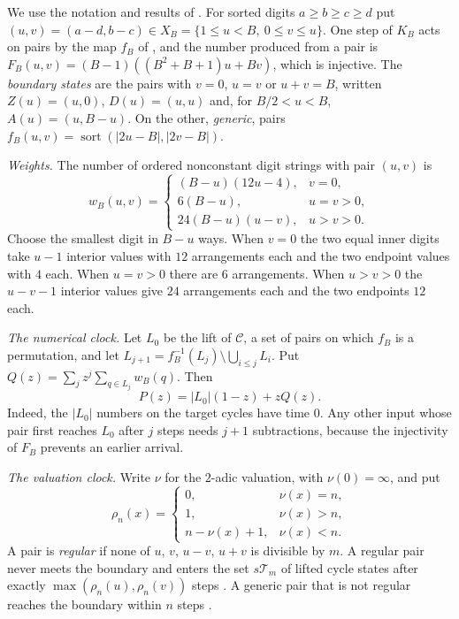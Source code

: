 \documentclass[11pt]{amsart}
\theoremstyle{remark}
\DeclareMathOperator{\sort}{sort}
\newcommand{\T}{\mathcal{T}}
\newcommand{\C}{\mathcal{C}}
\newcommand{\vt}{\nu}
\begin{document}
We use the notation and results of \cite{G1}. For sorted digits $a\ge b\ge c\ge d$ put $(u,v)=(a-d,b-c)\in X_B=\{1\le u<B,\ 0\le v\le u\}$. One step of $K_B$ acts on pairs by the map $f_B$ of \cite[(1)]{G1}, and the number produced from a pair is $F_B(u,v)=(B-1)((B^2+B+1)u+Bv)$, which is injective. The \emph{boundary states} are the pairs with $v=0$, $u=v$ or $u+v=B$, written $Z(u)=(u,0)$, $D(u)=(u,u)$ and, for $B/2<u<B$, $A(u)=(u,B-u)$. On the other, \emph{generic}, pairs $f_B(u,v)=\sort(|2u-B|,|2v-B|)$.

\emph{Weights.} The number of ordered nonconstant digit strings with pair $(u,v)$ is
\begin{equation}\label{eq:weight}
w_B(u,v)=\begin{cases}(B-u)(12u-4),&v=0,\\6(B-u),&u=v>0,\\24(B-u)(u-v),&u>v>0.\end{cases}
\end{equation}
Choose the smallest digit in $B-u$ ways. When $v=0$ the two equal inner digits take $u-1$ interior values with $12$ arrangements each and the two endpoint values with $4$ each. When $u=v>0$ there are $6$ arrangements. When $u>v>0$ the $u-v-1$ interior values give $24$ arrangements each and the two endpoints $12$ each.

\emph{The numerical clock.} Let $L_0$ be the lift of $\C$, a set of pairs on which $f_B$ is a permutation, and let $L_{j+1}=f_B^{-1}(L_j)\setminus\bigcup_{i\le j}L_i$. Put $Q(z)=\sum_jz^j\sum_{q\in L_j}w_B(q)$. Then
\begin{equation}\label{eq:clock}
P(z)=|L_0|(1-z)+zQ(z).
\end{equation}
Indeed, the $|L_0|$ numbers on the target cycles have time $0$. Any other input whose pair first reaches $L_0$ after $j$ steps needs $j+1$ subtractions, because the injectivity of $F_B$ prevents an earlier arrival.

\emph{The valuation clock.} Write $\vt$ for the $2$-adic valuation, with $\vt(0)=\infty$, and put
\[
\rho_n(x)=\begin{cases}0,&\vt(x)=n,\\1,&\vt(x)>n,\\n-\vt(x)+1,&\vt(x)<n.\end{cases}
\]
A pair is \emph{regular} if none of $u$, $v$, $u-v$, $u+v$ is divisible by $m$. A regular pair never meets the boundary and enters the set $s\T_m$ of lifted cycle states after exactly $\max(\rho_n(u),\rho_n(v))$ steps \cite[Lemma~6]{G1}. A generic pair that is not regular reaches the boundary within $n$ steps \cite[Lemma~6(c)]{G1}.
\end{document}
